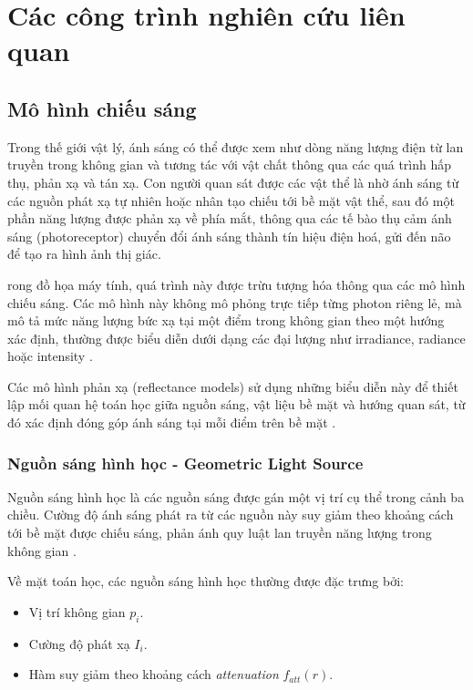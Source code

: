 \chapter{Các công trình nghiên cứu liên quan}

\section{Mô hình chiếu sáng}
Trong thế giới vật lý, ánh sáng có thể được xem như dòng năng lượng điện từ lan truyền trong không gian và tương tác với vật chất thông qua các quá trình hấp thụ, phản xạ và tán xạ. Con người quan sát được các vật thể là nhờ ánh sáng từ các nguồn phát xạ tự nhiên hoặc nhân tạo chiếu tới bề mặt vật thể, sau đó một phần năng lượng được phản xạ về phía mắt, thông qua các tế bào thụ cảm ánh sáng (photoreceptor) chuyển đổi ánh sáng thành tín hiệu điện hoá, gửi đến não để tạo ra hình ảnh thị giác.

rong đồ họa máy tính, quá trình này được trừu tượng hóa thông qua các mô hình chiếu sáng. Các mô hình này không mô phỏng trực tiếp từng photon riêng lẻ, mà mô tả mức năng lượng bức xạ tại một điểm trong không gian theo một hướng xác định, thường được biểu diễn dưới dạng các đại lượng như irradiance, radiance hoặc intensity \cite{principles_1990}.

Các mô hình phản xạ (reflectance models) sử dụng những biểu diễn này để thiết lập mối quan hệ toán học giữa nguồn sáng, vật liệu bề mặt và hướng quan sát, từ đó xác định đóng góp ánh sáng tại mỗi điểm trên bề mặt \cite{a_reflectance_model_1982}.

\subsection{Nguồn sáng hình học - Geometric Light Source}

Nguồn sáng hình học là các nguồn sáng được gán một vị trí cụ thể trong cảnh ba chiều. Cường độ ánh sáng phát ra từ các nguồn này suy giảm theo khoảng cách tới bề mặt được chiếu sáng, phản ánh quy luật lan truyền năng lượng trong không gian \cite{principles_1990}.

Về mặt toán học, các nguồn sáng hình học thường được đặc trưng bởi:
\begin{itemize}
	\item Vị trí không gian $p_i$.
	\item Cường độ phát xạ $I_i$.
	\item Hàm suy giảm theo khoảng cách \textit{attenuation} $f_{att}(r)$.
\end{itemize}

